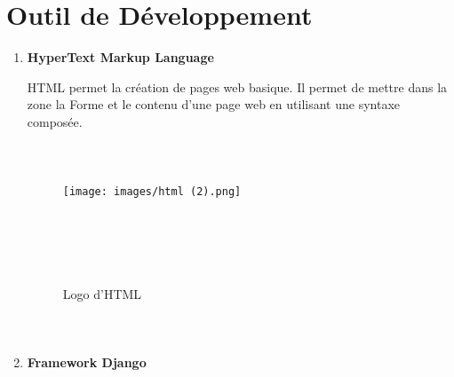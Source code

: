 
\section{Outil de Développement}

\begin{enumerate}
     \item \textbf{HyperText Markup Language}
    
 HTML permet la création de pages web basique. Il permet de mettre dans la zone la  Forme et le contenu d’une page web en utilisant une syntaxe composée.
\paragraph{\\}
 \renewcommand{\thefigure}{3}
    
    \begin{center}
        \begin{figure}[htbp]
    \centering
   \texttt{[image: images/html (2).png]} 
    \caption{Logo d'HTML}
   \paragraph{\\}\paragraph{\\}
    \label{fig:HyperText Markup Language}
\end{figure}
       
    \end{center}
    \paragraph{\\}

    \item \textbf{Framework Django}
    

\end{enumerate}

